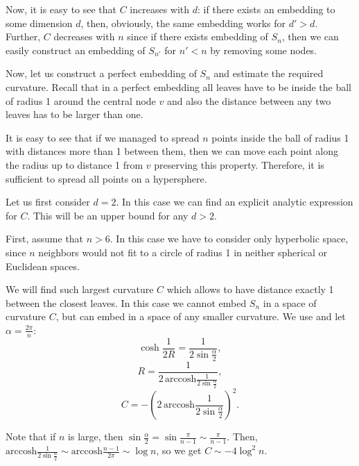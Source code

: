 \documentclass{article} %
\begin{document}
Now, it is easy to see that $C$ increases with $d$: if there exists an embedding to some dimension $d$, then, obviously, the same embedding works for $d' > d$. Further, $C$ decreases with $n$ since if there exists embedding of $S_n$, then we can easily construct an embedding of $S_{n'}$ for $n' < n$ by removing some nodes. 

Now, let us construct a perfect embedding of $S_n$
and estimate the required curvature.
Recall that in a perfect embedding all leaves have to be inside the ball of radius 1 around the central node $v$ and also the distance between any two leaves has to be larger than one. 

It is easy to see that if we managed to spread $n$ points inside the ball of radius 1 with distances more than 1 between them, then we can move each point along the radius up to distance 1 from $v$ preserving this property. Therefore, it is sufficient to spread all points on a hypersphere. 

Let us first consider $d = 2$. In this case we can find an explicit analytic expression for $C$. This will be an upper bound for any $d>2$.

First, assume that $n > 6$. In this case we have to consider only hyperbolic space, since $n$ neighbors would not fit to a circle of radius 1 in neither spherical or Euclidean spaces.

We will find such largest curvature $C$ which allows to have distance exactly 1 between the closest leaves. In this case we cannot embed $S_n$ in a space of curvature $C$, but can embed in a space of any smaller curvature. 
We use  and let $\alpha = \frac{2\pi}{n}$:
\[
\cosh\frac{1}{2R} = \frac{1}{2\sin \frac{\alpha}{2}},
\]
\[
R = \frac{1}{2\,\textrm{arccosh}\frac{1}{2\sin \frac{\alpha}{2}}},
\]
\[
C = - \left(2\,\textrm{arccosh}\frac{1}{2\sin \frac{\alpha}{2}}\right)^2.
\]

Note that if $n$ is large, then $\sin \frac{\alpha}{2} = \sin\frac{\pi}{n-1} \sim \frac{\pi}{n-1}$. Then,  $\textrm{arccosh}\frac{1}{2\sin \frac{\alpha}{2}} \sim \textrm{arccosh}\frac{n-1}{2\pi} \sim \log n$, so we get $C \sim - 4 \log^2 n$. 
\end{document}
